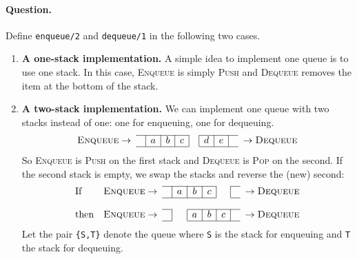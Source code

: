 \paragraph{Question.} Define \texttt{enqueue/2} and
\texttt{dequeue/1} in the following two cases.
\begin{enumerate}

  \item \textbf{A one-stack implementation.} A simple idea to
    implement one queue is to use one stack. In this case,
    \textsc{Enqueue} is simply \textsc{Push} and \textsc{Dequeue}
    removes the item at the bottom of the stack.

  \item \textbf{A two-stack implementation.} We can implement one
    queue with two stacks instead of one: one for enqueuing, one for
    dequeuing.
    \[
    \begin{array}{r@{\;}cc|c|c|c|c|c|c|cc@{\;}l}
      \cline{3-6}\cline{8-10}
      \textsc{Enqueue} & \rightarrow & & a & b & c & & d & e & &
      \rightarrow & \textsc{Dequeue}\\
      \cline{3-6}\cline{8-10}
    \end{array}
    \]
    \noindent So \textsc{Enqueue} is \textsc{Push} on the first stack
    and \textsc{Dequeue} is \textsc{Pop} on the second. If the second
    stack is empty, we swap the stacks and reverse the (new) second:
    \[
    \begin{array}{lr@{\;}cc|c|c|c|c|cc@{\;}l}
      \cline{4-7}\cline{9-9}
      \text{If} & \textsc{Enqueue} & \rightarrow & & a & b & c & & &
      \rightarrow & \textsc{Dequeue}\\
      \cline{4-7}\cline{9-9}\\
      \cline{4-4}\cline{6-9}
      \text{then} & \textsc{Enqueue} & \rightarrow & & & a & b & c & &
      \rightarrow & \textsc{Dequeue}\\
      \cline{4-4}\cline{6-9}
    \end{array}
    \]
    \noindent Let the pair \texttt{\{S,T\}} denote the queue where
    \texttt{S} is the stack for enqueuing and \texttt{T} the stack for
    dequeuing.

\end{enumerate}
